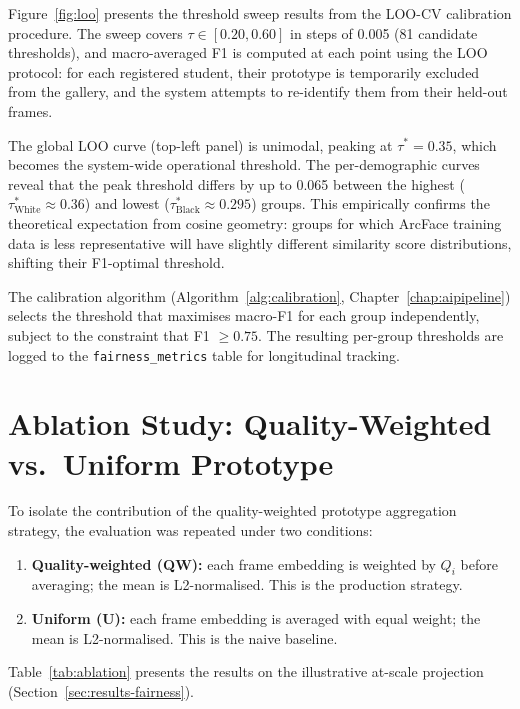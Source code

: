 \documentclass[12pt,a4paper]{report}
\begin{document}
Figure~\ref{fig:loo} presents the threshold sweep results from the LOO-CV calibration procedure. The sweep covers $\tau \in [0.20, 0.60]$ in steps of 0.005 (81 candidate thresholds), and macro-averaged F1 is computed at each point using the LOO protocol: for each registered student, their prototype is temporarily excluded from the gallery, and the system attempts to re-identify them from their held-out frames.

The global LOO curve (top-left panel) is unimodal, peaking at $\tau^* = 0.35$, which becomes the system-wide operational threshold. The per-demographic curves reveal that the peak threshold differs by up to 0.065 between the highest ($\tau^*_{\text{White}} \approx 0.36$) and lowest ($\tau^*_{\text{Black}} \approx 0.295$) groups. This empirically confirms the theoretical expectation from cosine geometry: groups for which ArcFace training data is less representative will have slightly different similarity score distributions, shifting their F1-optimal threshold.

The calibration algorithm (Algorithm~\ref{alg:calibration}, Chapter~\ref{chap:aipipeline}) selects the threshold that maximises macro-F1 for each group independently, subject to the constraint that F1 $\geq 0.75$. The resulting per-group thresholds are logged to the \texttt{fairness\_metrics} table for longitudinal tracking.

\section{Ablation Study: Quality-Weighted vs.\ Uniform Prototype}
\label{sec:ablation}

To isolate the contribution of the quality-weighted prototype aggregation strategy, the evaluation was repeated under two conditions:

\begin{enumerate}
  \item \textbf{Quality-weighted (QW):} each frame embedding is weighted by $Q_i$ before averaging; the mean is L2-normalised. This is the production strategy.
  \item \textbf{Uniform (U):} each frame embedding is averaged with equal weight; the mean is L2-normalised. This is the naive baseline.
\end{enumerate}

Table~\ref{tab:ablation} presents the results on the illustrative at-scale projection (Section~\ref{sec:results-fairness}).
\end{document}
